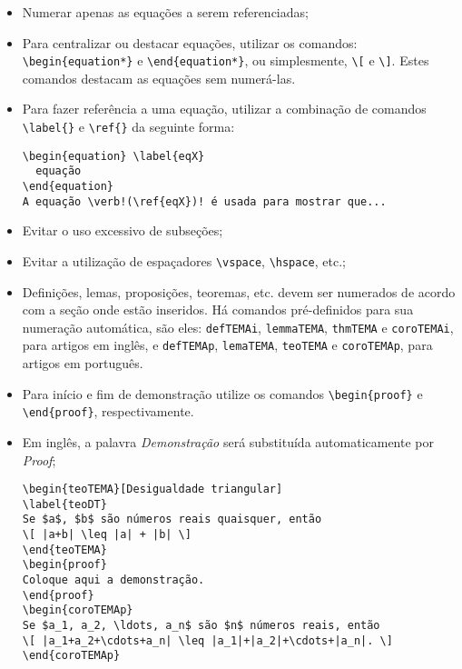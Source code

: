 \documentclass{TEMA}
\begin{document}
\begin{itemize}

\item Numerar apenas as equações a serem referenciadas;

\item Para centralizar ou destacar equações, utilizar os comandos: 
\verb!\begin{equation*}! e \verb!\end{equation*}!,
ou simplesmente,
\verb!\[! e \verb!\]!. 
Estes comandos destacam as equações sem numerá-las.

\item Para fazer referência a uma equação, utilizar a combinação 
de comandos \verb!\label{}! e \verb!\ref{}! da seguinte forma: \\
\begin{framed}
\begin{verbatim}
\begin{equation} \label{eqX}
  equação
\end{equation}
A equação \verb!(\ref{eqX})! é usada para mostrar que...
\end{verbatim}
\end{framed}

\item Evitar o uso excessivo de subseções;

\item Evitar a utilização de espaçadores 
\verb!\vspace!, \verb!\hspace!, etc.;

\item Definições, lemas, proposições, teoremas, etc. devem
ser numerados de acordo com a seção onde estão inseridos.  Há
comandos pré-definidos para sua numeração automática, são eles:
\texttt{defTEMAi}, \texttt{lemmaTEMA},  \texttt{thmTEMA} e 
\texttt{coroTEMAi},
para artigos em inglês, e  \texttt{defTEMAp}, \texttt{lemaTEMA}, 
\texttt{teoTEMA} e \texttt{coroTEMAp}, para artigos em português.

\item Para início e fim de demonstração utilize os comandos 
\verb!\begin{proof}! e \verb!\end{proof}!, respectivamente.

\item Em inglês, a palavra {\it Demonstração} será
substituída automaticamente por {\it Proof};

\begin{framed}
\begin{verbatim}
\begin{teoTEMA}[Desigualdade triangular]
\label{teoDT}
Se $a$, $b$ são números reais quaisquer, então
\[ |a+b| \leq |a| + |b| \]
\end{teoTEMA}
\begin{proof}
Coloque aqui a demonstração.
\end{proof}
\begin{coroTEMAp}
Se $a_1, a_2, \ldots, a_n$ são $n$ números reais, então
\[ |a_1+a_2+\cdots+a_n| \leq |a_1|+|a_2|+\cdots+|a_n|. \]
\end{coroTEMAp}
\end{verbatim}
\end{framed}


\end{itemize}
\end{document}
